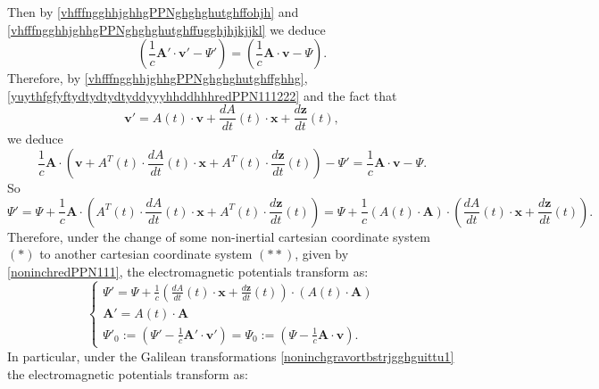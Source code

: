\documentclass{article}
\theoremstyle{definition}
\theoremstyle{remark}
\renewcommand{\vec}[1]{\mathbf{#1}}
\newcommand{\er}{\eqref}
\newcommand{\er}{\eqref}
\begin{document}
%
%
%
Then by \er{vhfffngghhjghhgPPNghghghutghffohjh} and
\er{vhfffngghhjghhgPPNghghghutghffugghjhjkjjkl} we deduce
\begin{equation}\label{vhfffngghhjghhgPPNghghghutghffghhg}
\left(\frac{1}{c}\vec A'\cdot\vec
v'-\Psi'\right)=\left(\frac{1}{c}\vec A\cdot\vec v-\Psi\right).
\end{equation}
Therefore, by \er{vhfffngghhjghhgPPNghghghutghffghhg},
\er{yuythfgfyftydtydtydtyddyyyhhddhhhredPPN111222}  and the fact
that
\begin{equation}
\label{NoIn5redPPNghjg}\vec v'=A(t)\cdot \vec
v+\frac{dA}{dt}(t)\cdot\vec x+\frac{d\vec z}{dt}(t),
\end{equation}
we deduce
\begin{equation}\label{vhfffngghhjghhgPPNghghghutghfflklhjkj}
\frac{1}{c}\vec A\cdot\left(\vec
v+A^T(t)\cdot\frac{dA}{dt}(t)\cdot\vec x+A^T(t)\cdot\frac{d\vec
z}{dt}(t)\right)-\Psi'=\frac{1}{c}\vec A\cdot\vec v-\Psi.
\end{equation}
So
\begin{equation}\label{vhfffngghhjghhgPPNghghghutghfflklhjkjhjg}
\Psi'=\Psi+\frac{1}{c}\vec
A\cdot\left(A^T(t)\cdot\frac{dA}{dt}(t)\cdot\vec
x+A^T(t)\cdot\frac{d\vec
z}{dt}(t)\right)=\Psi+\frac{1}{c}\left(A(t)\cdot\vec
A\right)\cdot\left(\frac{dA}{dt}(t)\cdot\vec x+\frac{d\vec
z}{dt}(t)\right).
\end{equation}
Therefore, under the change of some non-inertial cartesian
coordinate system $(*)$ to another cartesian coordinate system
$(**)$, given by \er{noninchredPPN111}, the electromagnetic
potentials transform as:
\begin{equation}\label{vhfffngghhjghhgPPNghghghutghfflklhjkjhjhjjgjkghhj}
\begin{cases}
\Psi'=
\Psi+\frac{1}{c}\left(\frac{dA}{dt}(t)\cdot\vec x+\frac{d\vec
z}{dt}(t)\right)\cdot\left(A(t)\cdot\vec A\right)
\\
\vec A'=A(t)\cdot \vec A\\
\Psi'_0:=\left(\Psi'-\frac{1}{c}\vec A'\cdot\vec
v'\right)=\Psi_0:=\left(\Psi-\frac{1}{c}\vec A\cdot\vec v\right).
\end{cases}
\end{equation}
In particular, under the Galilean transformations
\er{noninchgravortbstrjgghguittu1} the electromagnetic potentials
transform as:
%
%
%
\begin{comment}
\begin{equation}\label{noninchgravortbstrjgghguittu1GG}
\begin{cases}
\vec x'=\vec x+\vec wt,\\
t'=t,
\end{cases}
\end{equation}
\end{comment}
\end{document}
